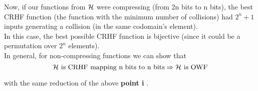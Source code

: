 Now, if our functions from $\mathcal{H}$ were compressing (from 2n bits to n bits), the
best CRHF function (the function with the minimum number of collisions) had
$2^{n} + 1 $ inputs generating a collision (in the same codomain's element).\\

In this case, the best possible CRHF function is bijective (since it could be a
permutation over $2^{n}$ elements).\\

In general, for non-compressing functions we can show that 
\[
    \mathcal{H} \text{ is CRHF mapping n bits to n bits}  \Rightarrow \mathcal{H} \text{ is OWF}
\]

with the same reduction of the above \textbf{point i} .

